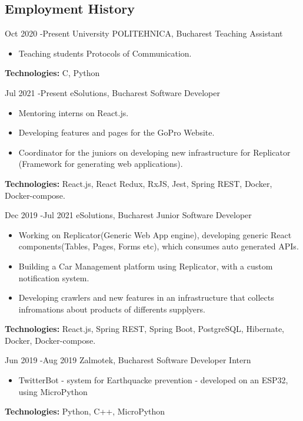 \documentclass[9pt]{article}
\begin{document}
\begin{paracol}{2}

\section{Employment History}
	\job
		{Oct 2020 -}{Present}
		{University POLITEHNICA, Bucharest}
		{Teaching Assistant}
		{
			\begin{itemize}
				\item Teaching students Protocols of Communication.
			\end{itemize}
			\rule{0mm}{5mm}\textbf{Technologies:} C, Python
		}
	\job
		{Jul 2021 -}{Present}
		{eSolutions, Bucharest}
		{Software Developer}
		{
			\begin{itemize}
				\item Mentoring interns on React.js.
				\item Developing features and pages for the GoPro Website.
				\item Coordinator for the juniors on developing new infrastructure for Replicator (Framework for generating web applications).
			\end{itemize}
			\rule{0mm}{5mm}\textbf{Technologies:} React.js, React Redux, RxJS, Jest, Spring REST, Docker, Docker-compose.}

	\job
		{Dec 2019 -}{Jul 2021}
		{eSolutions, Bucharest}
		{Junior Software Developer}
		{
		\begin{itemize}
			\item Working on Replicator(Generic Web App engine), developing generic React components(Tables, Pages, Forms etc), which consumes auto generated APIs.
			\item Building a Car Management platform using Replicator, with a custom notification system.
			\item Developing crawlers and new features in an infrastructure that collects infromations about products of differents supplyers.
		\end{itemize}
		\rule{0mm}{5mm}\textbf{Technologies:} React.js, Spring REST, Spring Boot, PostgreSQL, Hibernate, Docker, Docker-compose.}

	\job
		{Jun 2019 -}{Aug 2019}
		{Zalmotek, Bucharest}
		{Software Developer Intern}
		{  	
			\begin{itemize}
				\item TwitterBot - system for Earthquacke prevention - developed on an ESP32, using MicroPython 
			\end{itemize}
			\rule{0mm}{5mm}\textbf{Technologies:} Python, C++, MicroPython
		}


\end{paracol}
\end{document}
